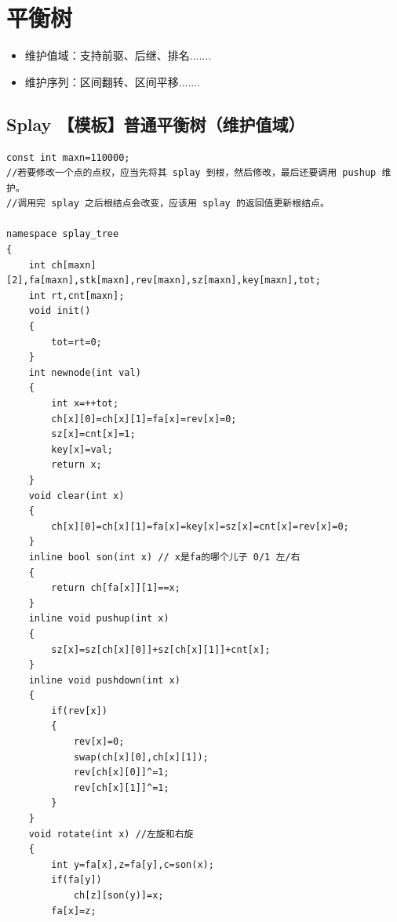 \section{平衡树}

\begin{itemize}
\item 维护值域：支持前驱、后继、排名.......
\item 维护序列：区间翻转、区间平移.......
\end{itemize}
\subsection{Splay 【模板】普通平衡树（维护值域）}
\begin{verbatim}
const int maxn=110000;
//若要修改一个点的点权，应当先将其 splay 到根，然后修改，最后还要调用 pushup 维护。
//调用完 splay 之后根结点会改变，应该用 splay 的返回值更新根结点。

namespace splay_tree
{
    int ch[maxn][2],fa[maxn],stk[maxn],rev[maxn],sz[maxn],key[maxn],tot;
    int rt,cnt[maxn];
    void init()
    {
        tot=rt=0;
    }
    int newnode(int val)
    {
        int x=++tot;
        ch[x][0]=ch[x][1]=fa[x]=rev[x]=0;
        sz[x]=cnt[x]=1;
        key[x]=val;
        return x;
    }
    void clear(int x)
    {
        ch[x][0]=ch[x][1]=fa[x]=key[x]=sz[x]=cnt[x]=rev[x]=0;
    }
    inline bool son(int x) // x是fa的哪个儿子 0/1 左/右
    {
        return ch[fa[x]][1]==x;
    }
    inline void pushup(int x)
    {
        sz[x]=sz[ch[x][0]]+sz[ch[x][1]]+cnt[x];
    }
    inline void pushdown(int x)
    {
        if(rev[x])
        {
            rev[x]=0;
            swap(ch[x][0],ch[x][1]);
            rev[ch[x][0]]^=1;
            rev[ch[x][1]]^=1; 
        }
    }
    void rotate(int x) //左旋和右旋
    {
        int y=fa[x],z=fa[y],c=son(x);
        if(fa[y])
            ch[z][son(y)]=x;
        fa[x]=z;


\end{verbatim}

